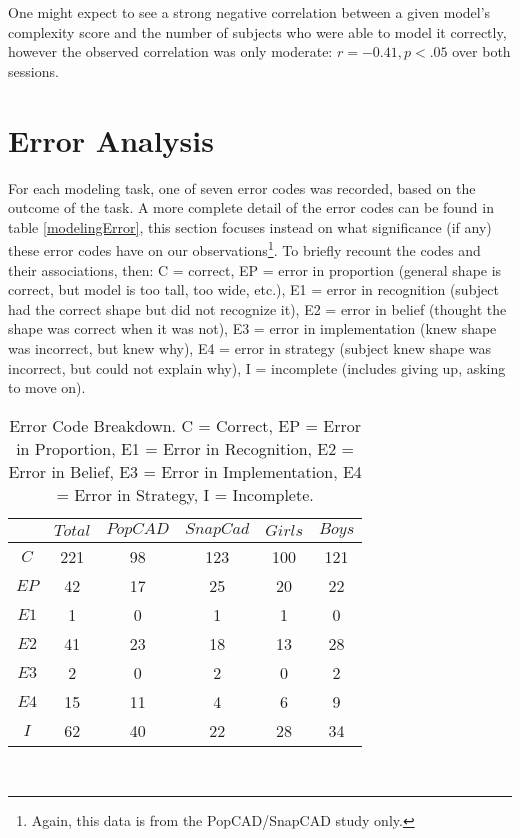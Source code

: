 One might expect to see a strong negative correlation between a given model's
complexity score and the number of subjects who were able to model it correctly,
however the observed correlation was only moderate: $r = -0.41, p < .05$ over
both sessions.


\section{Error Analysis}

For each modeling task, one of seven error codes was recorded, based on the
outcome of the task. A more complete detail of the error codes can be found in
table \ref{modelingError}, this section focuses instead on what significance
(if any) these error codes have on our observations\footnote{Again, this data
is from the PopCAD/SnapCAD study only.}. To briefly recount the codes and their
associations, then: C = correct, EP = error in proportion (general shape is
correct, but model is too tall, too wide, etc.), E1 = error in recognition
(subject had the correct shape but did not recognize it), E2 = error in belief
(thought the shape was correct when it was not), E3 = error in implementation
(knew shape was incorrect, but knew why), E4 = error in strategy (subject knew
shape was incorrect, but could not explain why), I = incomplete (includes
giving up, asking to move on).

\begin{table}[!ht] 
\small
    \caption[Modeling Error Code Breakdown]{Error Code Breakdown. C = Correct,
    EP = Error in Proportion, E1 = Error in Recognition, E2 = Error in Belief,
    E3 = Error in Implementation, E4 = Error in Strategy, I = Incomplete.}
    \begin{center}
    \begin{tabular}{| c | c | c | c | c | c | }
    \hline $ $ & $Total$ & $PopCAD$ & $SnapCad$ & $Girls$ & $Boys$ \\ \hline
	$C$ & 221 &	98 & 123 & 100 & 121 \\ \hline
	$EP$ & 42 &	17 & 25 & 20 & 22 \\ \hline
	$E1$ & 1 &	0 &	1 &	1 &	0 \\ \hline
	$E2$ & 41 &	23 & 18 & 13 & 28 \\ \hline
	$E3$ & 2&	0&	2&	0&	2 \\ \hline
	$E4$ & 15&	11&	4&	6&	9 \\ \hline
	$I$ & 62&	40&	22&	28&	34 \\ \hline
	\end{tabular}
   \\ \rule{0mm}{5mm}
\end{center}
\label{modelErrors}
\end{table}



